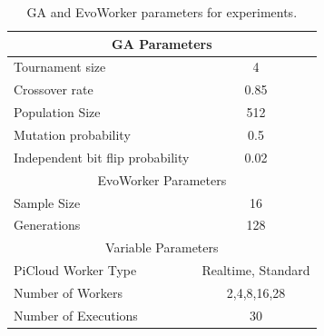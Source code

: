 \documentclass{llncs}
\begin{document}
\begin{table}[!t]
\renewcommand{\arraystretch}{1.3}
\caption{GA and EvoWorker parameters for experiments.}
\label{params}
\centering
\begin{tabular}{|l|c|}
\hline
\multicolumn{2}{|c|}{GA Parameters} \\
\hline
Tournament size & 4 \\
Crossover rate & 0.85  \\
Population Size & 512 \\
Mutation probability & 0.5 \\
Independent bit flip probability  & 0.02 \\
\hline
\multicolumn{2}{|c|}{EvoWorker Parameters} \\
\hline
Sample Size & 16 \\
Generations & 128 \\
\hline
\multicolumn{2}{|c|}{Variable Parameters} \\
\hline
PiCloud Worker Type & Realtime, Standard \\
Number of Workers & 2,4,8,16,28 \\
Number of Executions & 30 \\
\hline

\end{tabular}
\end{table}





%

\begin{footnotesize}

\end{footnotesize}
\end{document}
